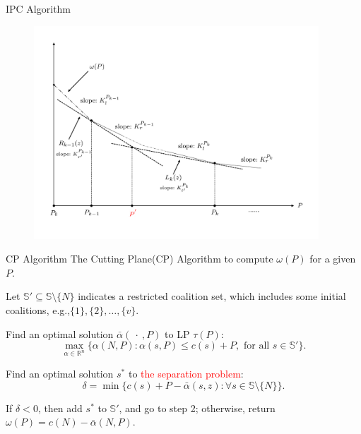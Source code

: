 \documentclass[14pt]{beamer}
\begin{document}
\begin{frame}{IPC Algorithm}
	\vspace{-3mm}
	\begin{figure}[H]
	\centering
	\includegraphics[width=0.95\textwidth]{Figures/IPC}
	\end{figure}
	\centering
\end{frame}


\begin{frame}{CP Algorithm}
	The Cutting Plane(CP) Algorithm to compute $\omega(P)$ for a given $P$.
	\begin{description}
	  \justifying
		\footnotesize
	  \item[Step 1.] Let $\mathbb{S}'\subseteq \mathbb{S}\setminus \{N\}$ indicates a restricted coalition set, which includes some initial coalitions,
	  \vspace{10pt}
	  e.g.,$ \{1\},\{2\},\ldots,\{v\}$.
	  \item[Step 2.] Find an optimal solution $\bar{\alpha}(\ \cdot \ ,P)$ to LP $\tau(P)$:
	  \begin{equation*}
	  \max_{\alpha\in \mathbb{R}^n} \big\{ \alpha(N,P): \alpha(s,P) \leq c(s)+P, \mbox{ for all } s \in \mathbb{S}'\big\}.
	  \end{equation*}
	  \vspace{-11pt}
	  \item[Step 3.]
	  Find an optimal solution $s^*$ to \textcolor{red}{the separation problem}:
	  \begin{equation*}
	  \delta = \min \big\{ c(s)+ P -\bar{\alpha}(s,z): \forall s \in \mathbb{S} \setminus \{N\}\big\}.
	  \end{equation*}
	  \item[Step 4.]
	  If $\delta<0$, then add $s^*$ to $\mathbb{S}'$, and go to step 2; otherwise, return $\omega(P)=c(N)-\bar{\alpha}(N,P)$.
	\end{description}

\end{frame}
\end{document}
